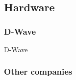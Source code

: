 \subsection{Hardware}
\subsubsection{D-Wave}
\label{subsub:d_wave_hardware}

\label{fig:d_wave_chimera}
D-Wave 
\subsubsection{Other companies}